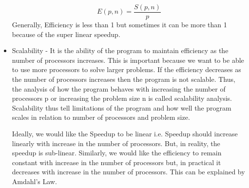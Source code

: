 \documentclass[12pt]{article}
\begin{document}
\begin{itemize}
    \[ E(p,n)=\dfrac{S(p,n)}{p}\]
    Generally, Efficiency is less than 1 but sometimes it can be more than 1 because of the super linear speedup.
    \item Scalability - It is the ability of the program to maintain efficiency as the number of processors increases. This is important because we want to be able to use more processors to solve larger problems. If the efficiency decreases as the number of processors increases then the program is not scalable. 
    Thus, the analysis of how the program behaves with increasing the number of processors p or increasing the problem size n is called scalability analysis. Scalability thus tell limitations of the program and how well the program scales in relation to number of processors and problem size.

    Ideally, we would like the Speedup to be linear i.e. Speedup should increase linearly with increase in the number of processors. But, in reality, the speedup is sub-linear.
    Similarly, we would like the efficiency to remain constant with increase in the number of processors but, in practical it decreases with increase in the number of processors.
    This can be explained by Amdahl's Law.


\end{itemize}
\end{document}
